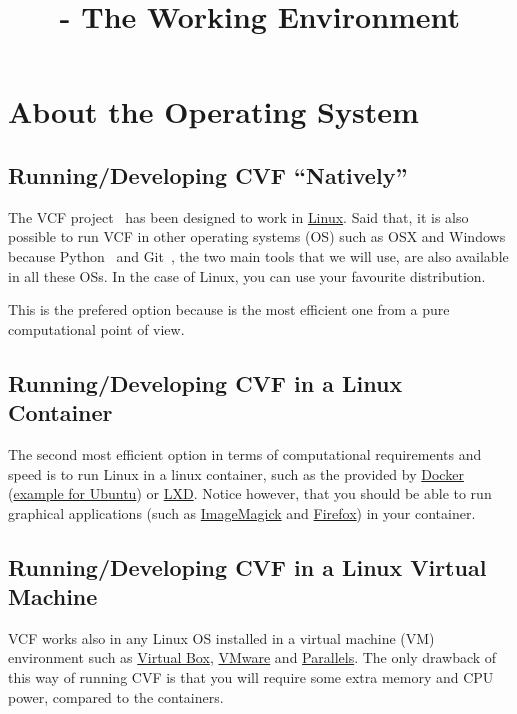 
\title{\SM{} - The Working Environment}

\maketitle

\tableofcontents

\section{About the Operating System}

\subsection{Running/Developing CVF ``Natively''}
The VCF project~\cite{vruiz__VCF} has been designed to work in
\href{https://en.wikipedia.org/wiki/Linux}{Linux}. Said that, it is
also possible to run VCF in other operating systems (OS) such as OSX
and Windows because Python~\cite{vruiz__YAPT} and
Git~\cite{vruiz__GitHub}, the two main tools that we will use, are
also available in all these OSs. In the case of Linux, you can use
your favourite distribution.

This is the prefered option because is the most efficient one from a
pure computational point of view.

\subsection{Running/Developing CVF in a Linux Container}
The second most efficient option in terms of computational
requirements and speed is to run Linux in a linux container, such
as the provided by \href{https://hub.docker.com/}{Docker}
(\href{https://hub.docker.com/_/ubuntu}{example for Ubuntu})
or \href{https://linuxcontainers.org/}{LXD}. Notice however, that you
should be able to run graphical applications (such
as \href{https://linuxcontainers.org/}{ImageMagick}
and \href{https://www.mozilla.org/firefox}{Firefox}) in your
container.

\subsection{Running/Developing CVF in a Linux Virtual Machine}
VCF works also in any Linux OS installed in a virtual machine (VM)
environment such as \href{https://www.virtualbox.org/}{Virtual Box},
\href{https://www.vmware.com/}{VMware} and \href{https://www.vmware.com/}{Parallels}.
The only drawback of this way of running CVF is that you will require
some extra memory and CPU power, compared to the containers.

